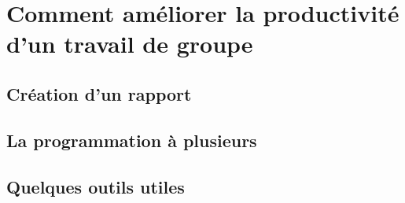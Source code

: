 \section*{Comment améliorer la productivité d'un travail de groupe}

\subsection*{Création d'un rapport}

\subsection*{La programmation à plusieurs}

\subsection*{Quelques outils utiles}
                                                                                                                   

	